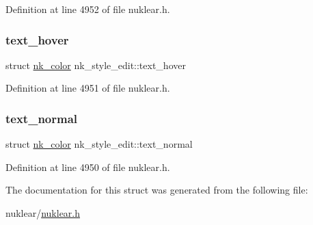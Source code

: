 Definition at line 4952 of file nuklear.\+h.

\mbox{\label{structnk__style__edit_a7af161d85dc3942b7f28e8ef127d0209}} 
\subsubsection{\texorpdfstring{text\+\_\+hover}{text\_hover}}
{\footnotesize\ttfamily struct \mbox{\hyperlink{structnk__color}{nk\+\_\+color}} nk\+\_\+style\+\_\+edit\+::text\+\_\+hover}



Definition at line 4951 of file nuklear.\+h.

\mbox{\label{structnk__style__edit_acad2fea48a0bd07cf6a21a30292ee3ff}} 
\subsubsection{\texorpdfstring{text\+\_\+normal}{text\_normal}}
{\footnotesize\ttfamily struct \mbox{\hyperlink{structnk__color}{nk\+\_\+color}} nk\+\_\+style\+\_\+edit\+::text\+\_\+normal}



Definition at line 4950 of file nuklear.\+h.



The documentation for this struct was generated from the following file\+:\begin{DoxyCompactItemize}
\item 
nuklear/\mbox{\hyperlink{nuklear_8h}{nuklear.\+h}}\end{DoxyCompactItemize}
